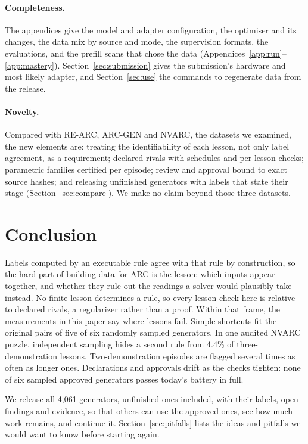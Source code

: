 \documentclass[11pt]{article}
\begin{document}
\paragraph{Completeness.} The appendices give the model and adapter
configuration, the optimiser and its changes, the data mix by source and mode,
the supervision formats, the evaluations, and the prefill scans that chose the
data (Appendices~\ref{app:run}--\ref{app:mastery}). Section~\ref{sec:submission}
gives the submission's hardware and most likely adapter, and
Section~\ref{sec:use} the commands to regenerate data from the release.

\paragraph{Novelty.} Compared with RE-ARC, ARC-GEN and NVARC, the datasets we
examined, the new elements are: treating the identifiability of each lesson,
not only label agreement, as a requirement; declared rivals with schedules and
per-lesson checks; parametric families certified per episode; review and
approval bound to exact source hashes; and releasing unfinished generators with
labels that state their stage (Section~\ref{sec:compare}). We make no claim
beyond those three datasets.

\section{Conclusion}
\label{sec:conclusion}

Labels computed by an executable rule agree with that rule by construction, so the hard
part of building data for ARC is the lesson: which inputs appear together, and
whether they rule out the readings a solver would plausibly take instead. No
finite lesson determines a rule, so every lesson check here is relative to
declared rivals, a regularizer rather than a proof. Within that frame,
the measurements in this paper say where lessons fail. Simple shortcuts fit the
original pairs of five of six randomly sampled generators. In one audited NVARC
puzzle, independent sampling hides a second rule from 4.4\% of
three-demonstration lessons. Two-demonstration
episodes are flagged several times as often as longer ones. Declarations and
approvals drift as the checks tighten: none of six sampled approved generators
passes today's battery in full.

We release all 4,061 generators, unfinished ones included, with their labels,
open findings and evidence, so that others can use the approved ones, see how
much work remains, and continue it. Section~\ref{sec:pitfalls} lists the ideas
and pitfalls we would want to know before starting again.
\end{document}
